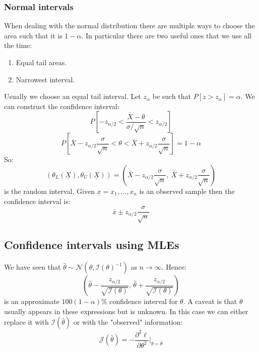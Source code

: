 \documentclass[12pt]{article}
\newcommand{\pf}[2]{\frac{\partial #1}{\partial #2}}
\begin{document}
\subsubsection{Normal intervals}
When dealing with the normal distribution there are multiple ways to choose the area such that it is \(1-\alpha\). In particular there are two useful ones that we use all the time:
\begin{enumerate}
    \item Equal tail areas.
    \item Narrowest interval.
\end{enumerate}
Usually we choose an equal tail interval. Let \(z_{\alpha}\) be such that \(P[z>z_{\alpha}]=\alpha\). We can construct the confidence interval:
\[P\left[-z_{\alpha/2}<\frac{\bar{X}-\theta}{\sigma/\sqrt{n}}<z_{\alpha/2}\right]\]
\[P\left[\bar{X}-z_{\alpha/2}\frac{\sigma}{\sqrt{n}}<\theta<\bar{X}+z_{\alpha/2}\frac{\sigma}{\sqrt{n}}\right]=1-\alpha\]
So:
\[(\theta_L(\underline{X}),\theta_U(\underline{X}))=\left(\bar{X}-z_{\alpha/2}\frac{\sigma}{\sqrt{n}},\ \bar{X}+z_{\alpha/2}\frac{\sigma}{\sqrt{n}}\right)\]
is the random interval. Given \(\underline{x}=x_1,\dots,x_n\) is an observed sample then the confidence interval is:
\[\bar{x}\pm z_{\alpha/2}\frac{\sigma}{\sqrt{n}}\]
\subsection{Confidence intervals using MLEs}
We have seen that \(\hat{\theta}\sim\mathcal{N}(\theta, \mathcal{I}(\theta)^{-1})\) as \(n\to\infty\). Hence:
\[\left(\hat{\theta}-\frac{z_{\alpha/2}}{\sqrt{\mathcal{I}(\theta)}},\, \hat{\theta}+\frac{z_{\alpha/2}}{\sqrt{\mathcal{I}(\theta)}}\right)\]
is an approximate \(100(1-\alpha)\%\) confidence interval for \(\theta\). A caveat is that \(\theta\) usually appears in these expressions but is unknown. In this case we can either replace it with \(\mathcal{I}(\hat{\theta})\) or with the "observed" information:
\[\mathcal{J}(\hat{\theta})=-\pf{^2\ell}{\theta^2}|_{\theta=\hat{\theta}}\]
\end{document}
